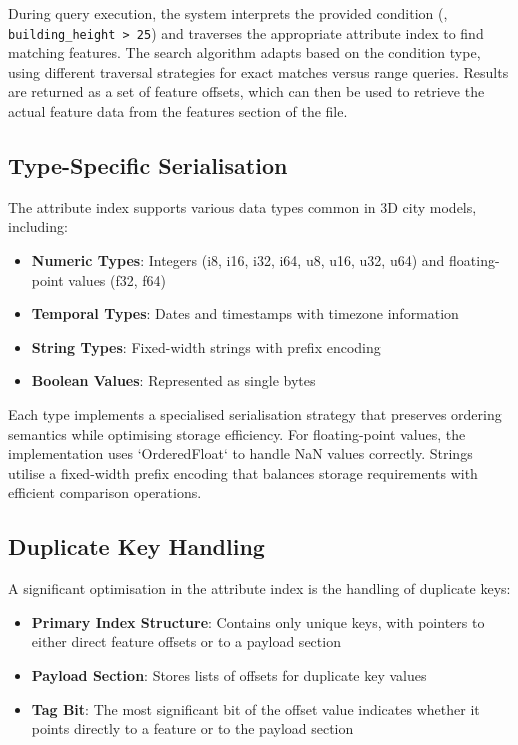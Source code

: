 During query execution, the system interprets the provided condition (\eg, \texttt{building\_height > 25}) and traverses the appropriate attribute index to find matching features. The search algorithm adapts based on the condition type, using different traversal strategies for exact matches versus range queries. Results are returned as a set of feature offsets, which can then be used to retrieve the actual feature data from the features section of the file.

\subsection{Type-Specific Serialisation}
\label{methodology:attribute_index:type_specific_serialisation}

The attribute index supports various data types common in 3D city models, including:

\begin{itemize}
    \item \textbf{Numeric Types}: Integers (i8, i16, i32, i64, u8, u16, u32, u64) and floating-point values (f32, f64)
    \item \textbf{Temporal Types}: Dates and timestamps with timezone information
    \item \textbf{String Types}: Fixed-width strings with prefix encoding
    \item \textbf{Boolean Values}: Represented as single bytes
\end{itemize}

Each type implements a specialised serialisation strategy that preserves ordering semantics while optimising storage efficiency. For floating-point values, the implementation uses `OrderedFloat` to handle NaN values correctly. Strings utilise a fixed-width prefix encoding that balances storage requirements with efficient comparison operations.

\subsection{Duplicate Key Handling}
\label{methodology:attribute_index:duplicate_key_handling}

A significant optimisation in the attribute index is the handling of duplicate keys:

\begin{itemize}
    \item \textbf{Primary Index Structure}: Contains only unique keys, with pointers to either direct feature offsets or to a payload section
    \item \textbf{Payload Section}: Stores lists of offsets for duplicate key values
    \item \textbf{Tag Bit}: The most significant bit of the offset value indicates whether it points directly to a feature or to the payload section
\end{itemize}

